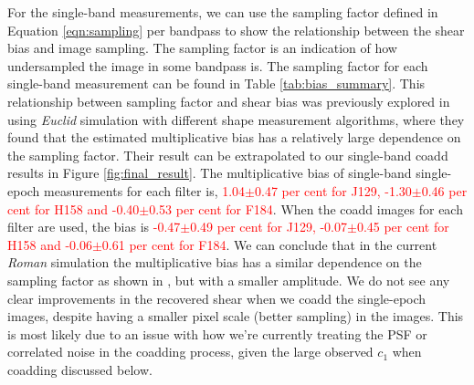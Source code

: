 \documentclass[fleqn,usenatbib]{mnras}
\begin{document}
For the single-band measurements, we can use the sampling factor defined in Equation \ref{eqn:sampling} per bandpass to show the relationship between the shear bias and image sampling. The sampling factor is an indication of how undersampled the image in some bandpass is. The sampling factor for each single-band measurement can be found in Table \ref{tab:bias_summary}. This relationship between sampling factor and shear bias was previously explored in \citealt{2021MNRAS.502.4048K} using \emph{Euclid} simulation with different shape measurement algorithms, where they found that the estimated multiplicative bias has a relatively large dependence on the sampling factor. Their result can be extrapolated to our single-band coadd results in Figure \ref{fig:final_result}. The multiplicative bias of single-band single-epoch measurements for each filter is, \textcolor{red}{1.04$\pm$0.47 per cent for J129, -1.30$\pm$0.46 per cent for H158 and -0.40$\pm$0.53 per cent for F184}. When the coadd images for each filter are used, the bias is \textcolor{red}{-0.47$\pm$0.49 per cent for J129, -0.07$\pm$0.45 per cent for H158 and -0.06$\pm$0.61 per cent for F184}. We can conclude that in the current \emph{Roman} simulation the multiplicative bias has a similar dependence on the sampling factor as shown in \citealt{2021MNRAS.502.4048K}, but with a smaller amplitude. We do not see any clear improvements in the recovered shear when we coadd the single-epoch images, despite having a smaller pixel scale (better sampling) in the images. This is most likely due to an issue with how we're currently treating the PSF or correlated noise in the coadding process, given the large observed $c_1$ when coadding discussed below. 
\end{document}
